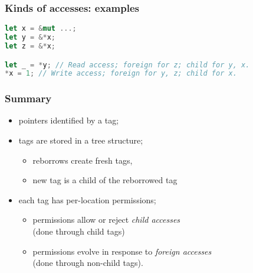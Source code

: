 \begin{frame}[fragile]
    \frametitle{Kinds of accesses: examples}
    \begin{block}{}
        \begin{lstlisting}[language=rust]
let x = &mut ...;
let y = &*x;
let z = &*x;

let _ = *y; // Read access; foreign for z; child for y, x.
*x = 1; // Write access; foreign for y, z; child for x.
        \end{lstlisting}
    \end{block}
    \begin{block}{}
        \centering
    \end{block}
\end{frame}

\begin{frame}
    \frametitle{Summary}
    \begin{itemize}
        \item pointers identified by a tag;
        \item tags are stored in a tree structure;
            \begin{itemize}
                \item reborrows create fresh tags,
                \item new tag is a child of the reborrowed tag
            \end{itemize}
        \item each tag has per-location permissions;
            \begin{itemize}
                \item permissions allow or reject \textit{child accesses}\\
                    (done through child tags)
                \item permissions evolve in response to \textit{foreign accesses}\\
                    (done through non-child tags).
            \end{itemize}
    \end{itemize}
\end{frame}
